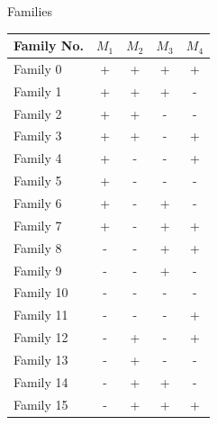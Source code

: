 \documentclass[aerospace,article,submit,moreauthors,dvi2pdf]{Definitions/mdpi}
\begin{document}
\begin{specialtable}[hbt!]
\caption{\label{tab:Families} Families}
\begin{tabular}{lcccc}
\toprule
\textbf{Family No.}&$M_1$&$M_2$&$M_3$&$M_4$\\
\midrule
Family 0&+ & + & + & +  \\
Family 1&+ & + & + & -  \\
Family 2&+ & + & - & -  \\
Family 3&+ & + & - & +  \\
Family 4&+ & - & - & +  \\
Family 5&+ & - & - & -  \\
Family 6&+ & - & + & -  \\
Family 7&+ & - & + & +  \\
Family 8&- & - & + & +  \\
Family 9&- & - & + & -  \\
Family 10&- & - & - & -  \\
Family 11&- & - & - & +  \\
Family 12&- & + & - & +  \\
Family 13&- & + & - & -  \\
Family 14&- & + & + & -  \\
Family 15&- & + & + & + \\
\bottomrule
\end{tabular}
\end{specialtable}
\end{document}
